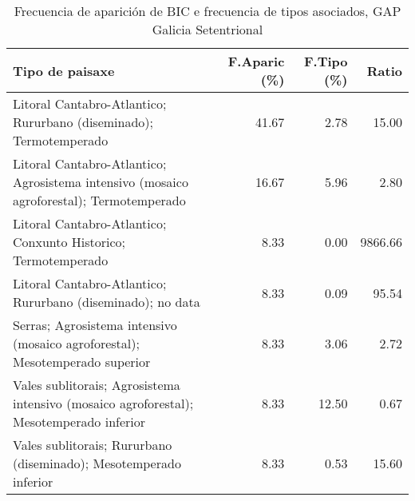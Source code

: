 \begin{table}[p]
\centering
\caption{Frecuencia de aparición de BIC e frecuencia de tipos asociados, GAP Galicia Setentrional} 
\label{vbic10}
\begin{tabular}{lrrr}
  \hline
Tipo de paisaxe & F.Aparic (\%) & F.Tipo (\%) & Ratio \\ 
  \hline
Litoral Cantabro-Atlantico; Rururbano (diseminado); Termotemperado & 41.67 & 2.78 & 15.00 \\ 
  Litoral Cantabro-Atlantico; Agrosistema intensivo (mosaico agroforestal); Termotemperado & 16.67 & 5.96 & 2.80 \\ 
  Litoral Cantabro-Atlantico; Conxunto Historico; Termotemperado & 8.33 & 0.00 & 9866.66 \\ 
  Litoral Cantabro-Atlantico; Rururbano (diseminado); no data & 8.33 & 0.09 & 95.54 \\ 
  Serras; Agrosistema intensivo (mosaico agroforestal); Mesotemperado superior & 8.33 & 3.06 & 2.72 \\ 
  Vales sublitorais; Agrosistema intensivo (mosaico agroforestal); Mesotemperado inferior & 8.33 & 12.50 & 0.67 \\ 
  Vales sublitorais; Rururbano (diseminado); Mesotemperado inferior & 8.33 & 0.53 & 15.60 \\ 
   \hline
\end{tabular}
\end{table}
